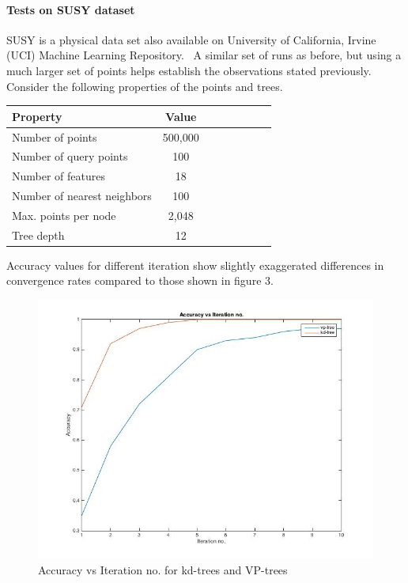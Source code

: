 \documentclass[11pt]{article}
\begin{document}
\paragraph{Tests on SUSY dataset} SUSY is a physical data set also available on University of California, Irvine (UCI) Machine Learning Repository.~\cite{Whiteson2014} A similar set of runs as before, but using a much larger set of points helps establish the observations stated previously. Consider the following properties of the points and trees.
\begin{center}
\begin{tabular}{l*{6}{c}r} Property & Value \\ 
\hline 
Number of points & 500,000 \\ 
Number of query points & 100 \\ 
Number of features & 18 \\ 
Number of nearest neighbors & 100 \\ 
Max. points per node & 2,048 \\
Tree depth & 12 \\
\end{tabular}
 \label{tab:results_susy}
\end{center}
Accuracy values for different iteration show slightly exaggerated differences in convergence rates compared to those shown in figure 3. 
\begin{figure}[ht]
\centering
\includegraphics[scale=0.5]{./images/kdvsvpsusy.jpg}
\caption{Accuracy vs Iteration no. for kd-trees and VP-trees}
\label{fig:vpvskdsusy}
\end{figure}
\\
\pagebreak
{}

\end{document}
